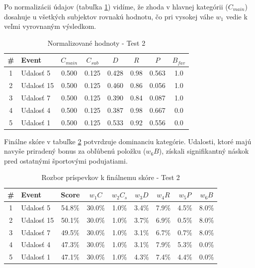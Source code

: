 Po normalizácii údajov (tabuľka \ref{tab:norm_test2}) vidíme, že zhoda v hlavnej kategórii ($C_{main}$) dosahuje u všetkých subjektov rovnakú hodnotu, čo pri vysokej váhe $w_1$ vedie k veľmi vyrovnaným výsledkom.

\begin{table}[H]
\centering
\small
\begin{tabular}{|c|l|c|c|c|c|c|c|}
\hline
\textbf{\#} & \textbf{Event} & $C_{main}$ & $C_{sub}$ & $D$ & $R$ & $P$ & $B_{fav}$ \\
\hline
1 & Udalosť 5  & 0.500 & 0.125 & 0.428 & 0.98 & 0.563 & 1.0 \\
2 & Udalosť 15 & 0.500 & 0.125 & 0.460 & 0.86 & 0.056 & 1.0 \\
3 & Udalosť 7  & 0.500 & 0.125 & 0.390 & 0.84 & 0.087 & 1.0 \\
4 & Udalosť 4  & 0.500 & 0.125 & 0.387 & 0.98 & 0.667 & 0.0 \\
5 & Udalosť 1  & 0.500 & 0.125 & 0.533 & 0.92 & 0.556 & 0.0 \\
\hline
\end{tabular}
\caption{Normalizované hodnoty - Test 2}
\label{tab:norm_test2}
\end{table}

Finálne skóre v tabuľke \ref{tab:vysledky_test2} potvrdzuje dominanciu kategórie. Udalosti, ktoré majú navyše priradený bonus za obľúbenú položku ($w_6 B$), získali signifikantný náskok pred ostatnými športovými podujatiami.

\begin{table}[H]
\centering
\small
\begin{tabular}{|c|l|c|c|c|c|c|c|c|}
\hline
\textbf{\#} & \textbf{Event} & \textbf{Score} & $w_1 C$ & $w_2 C_s$ & $w_3 D$ & $w_4 R$ & $w_5 P$ & $w_6 B$ \\
\hline
1 & Udalosť 5  & 54.8\% & 30.0\% & 1.0\% & 3.4\% & 7.9\% & 4.5\% & 8.0\% \\
2 & Udalosť 15 & 50.1\% & 30.0\% & 1.0\% & 3.7\% & 6.9\% & 0.5\% & 8.0\% \\
3 & Udalosť 7  & 49.5\% & 30.0\% & 1.0\% & 3.1\% & 6.7\% & 0.7\% & 8.0\% \\
4 & Udalosť 4  & 47.3\% & 30.0\% & 1.0\% & 3.1\% & 7.9\% & 5.3\% & 0.0\% \\
5 & Udalosť 1  & 47.1\% & 30.0\% & 1.0\% & 4.3\% & 7.4\% & 4.4\% & 0.0\% \\
\hline
\end{tabular}
\caption{Rozbor príspevkov k finálnemu skóre - Test 2}
\label{tab:vysledky_test2}
\end{table}

